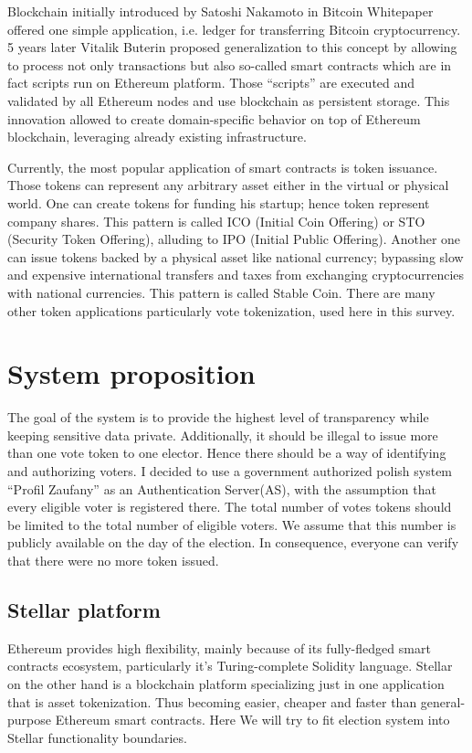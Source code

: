 \documentclass[runningheads]{llncs}
\begin{document}
Blockchain initially introduced by Satoshi Nakamoto in Bitcoin Whitepaper offered one simple application, i.e. ledger for transferring Bitcoin cryptocurrency. 5 years later Vitalik Buterin proposed generalization to this concept by allowing to process not only transactions but also so-called smart contracts which are in fact scripts run on Ethereum platform. Those “scripts” are executed and validated by all Ethereum nodes and use blockchain as persistent storage. This innovation allowed to create domain-specific behavior on top of Ethereum blockchain, leveraging already existing infrastructure.

Currently, the most popular application of smart contracts is token issuance. Those tokens can represent any arbitrary asset either in the virtual or physical world. One can create tokens for funding his startup; hence token represent company shares. This pattern is called ICO (Initial Coin Offering) or STO (Security Token Offering), alluding to IPO (Initial Public Offering). Another one can issue tokens backed by a physical asset like national currency; bypassing slow and expensive international transfers and taxes from exchanging cryptocurrencies with national currencies. This pattern is called Stable Coin. There are many other token applications particularly vote tokenization, used here in this survey.


\section{System proposition}
The goal of the system is to provide the highest level of transparency while keeping sensitive data private. Additionally, it should be illegal to issue more than one vote token to one elector. Hence there should be a way of identifying and authorizing voters. I decided to use a government authorized polish system
“Profil Zaufany” as an Authentication Server(AS), with the assumption that every eligible voter is registered there. The total number of votes tokens should be limited to the total number of eligible voters. We assume that this number is publicly available on the day of the election. In consequence, everyone can verify that there were no more token issued. 

\subsection{Stellar platform}
Ethereum provides high flexibility, mainly because of its fully-fledged smart contracts ecosystem, particularly it’s Turing-complete Solidity language. Stellar on the other hand is a blockchain platform specializing just in one application that is asset tokenization. Thus becoming easier, cheaper and faster than general-purpose Ethereum smart contracts. Here We will try to fit election system into Stellar functionality boundaries.
\end{document}
